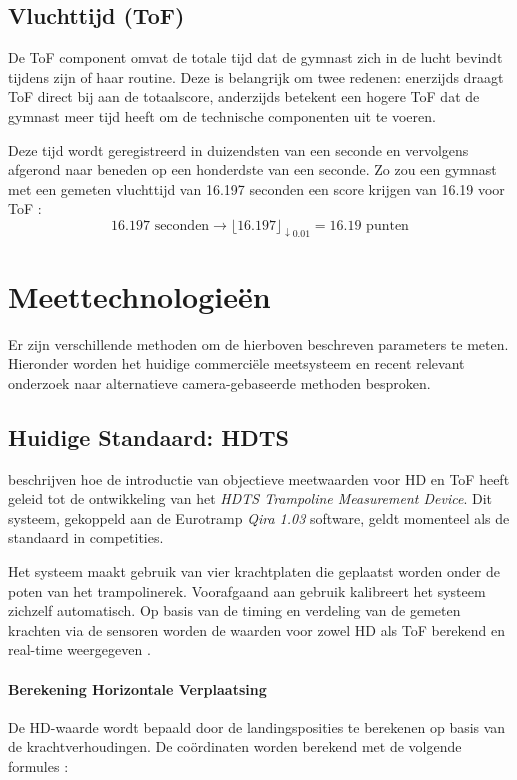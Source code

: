 \subsection{Vluchttijd (ToF)}
De ToF component omvat de totale tijd dat de gymnast zich in de lucht bevindt tijdens zijn of haar routine. Deze is belangrijk om twee redenen: enerzijds draagt ToF direct bij aan de totaalscore, anderzijds betekent een hogere ToF dat de gymnast meer tijd heeft om de technische componenten uit te voeren.

Deze tijd wordt geregistreerd in duizendsten van een seconde en vervolgens afgerond naar beneden op een honderdste van een seconde. Zo zou een gymnast met een gemeten vluchttijd van 16.197 seconden een score krijgen van 16.19 voor ToF \autocite{FTTC2024}:
\[
    16.197 \text{ seconden} \rightarrow \lfloor 16.197 \rfloor_{\downarrow 0.01} = 16.19 \text{ punten}
\]

\section{Meettechnologie{\"e}n}
\label{sec:state_of_the_art}

Er zijn verschillende methoden om de hierboven beschreven parameters te meten. Hieronder worden het huidige commerci{\"e}le meetsysteem en recent relevant onderzoek naar alternatieve camera-gebaseerde methoden besproken.

\subsection{Huidige Standaard: HDTS}
\textcite{Ferger2017} beschrijven hoe de introductie van objectieve meetwaarden voor HD en ToF heeft geleid tot de ontwikkeling van het \emph{HDTS Trampoline Measurement Device}. Dit systeem, gekoppeld aan de Eurotramp \textit{Qira 1.03} software, geldt momenteel als de standaard in competities.

Het systeem maakt gebruik van vier krachtplaten die geplaatst worden onder de poten van het trampolinerek. Voorafgaand aan gebruik kalibreert het systeem zichzelf automatisch. Op basis van de timing en verdeling van de gemeten krachten via de sensoren worden de waarden voor zowel HD als ToF berekend en real-time weergegeven \autocite{Dyas2023}.

\paragraph{Berekening Horizontale Verplaatsing}
De HD-waarde wordt bepaald door de landingsposities te berekenen op basis van de krachtverhoudingen. De coördinaten worden berekend met de volgende formules \autocite{Ferger2019}:

